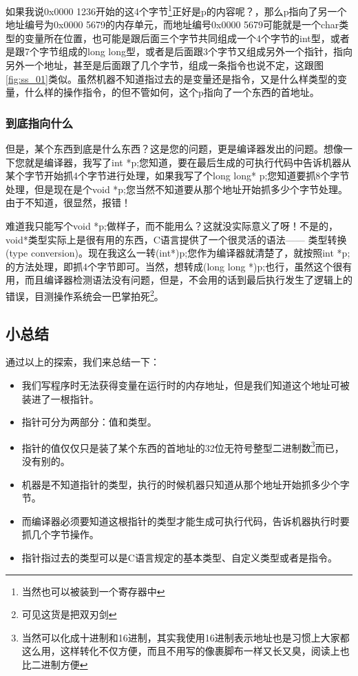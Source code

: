 \documentclass[11pt,twoside,a4paper,titlepage]{article}	%
\newcommand{\kw}[1]{\textcolor[rgb]{0.0,0.0,0.63}{ #1}}
\begin{document}
如果我说0x0000 1236开始的这4个字节\footnote{当然也可以被装到一个寄存器中}正好是p的内容呢？，那么p指向了另一个地址编号为0x0000 5679的内存单元，而地址编号0x0000 5679可能就是一个char类型的变量所在位置，也可能是跟后面三个字节共同组成一个4个字节的int型，或者是跟7个字节组成的long long型，或者是后面跟3个字节又组成另外一个指针，指向另外一个地址，甚至是后面跟了几个字节，组成一条指令也说不定，这跟图 \ref{fig:ss_01}类似。虽然机器不知道指过去的是变量还是指令，又是什么样类型的变量，什么样的操作指令，的但不管如何，这个p指向了一个东西的首地址。

\subsubsection{到底指向什么}
但是，某个东西到底是什么东西？这是您的问题，更是编译器发出的问题。想像一下您就是编译器，我写了int *p;您知道，要在最后生成的可执行代码中告诉机器从某个字节开始抓4个字节进行处理，如果我写了个long long* p;您知道要抓8个字节处理，但是现在是个void *p;您当然不知道要从那个地址开始抓多少个字节处理。由于不知道，很显然，报错！

难道我只能写个void *p;做样子，而不能用么？这就没实际意义了呀！不是的，void*类型实际上是很有用的东西，C语言提供了一个很灵活的语法——\kw{类型转换(type conversion)}。现在我这么一转(int*)p;您作为编译器就清楚了，就按照int *p;的方法处理，即抓4个字节即可。当然，想转成(long long *)p;也行，虽然这个很有用，而且编译器检测语法没有问题，但是，不会用的话到最后执行发生了逻辑上的错误，目测操作系统会一巴掌拍死\footnote{可见这货是把双刃剑}。

\subsection{小总结}
通过以上的探索，我们来总结一下：
\begin{itemize}
	\item 我们写程序时无法获得变量在运行时的内存地址，但是我们知道这个地址可被装进了一根指针。
	\item 指针可分为两部分：值和类型。
	\item 指针的值仅仅只是装了某个东西的首地址的32位无符号整型二进制数\footnote{当然可以化成十进制和16进制，其实我使用16进制表示地址也是习惯上大家都这么用，这样转化不仅方便，而且不用写的像裹脚布一样又长又臭，阅读上也比二进制方便}而已，没有别的。
	\item 机器是不知道指针的类型，执行的时候机器只知道从那个地址开始抓多少个字节。
	\item 而编译器必须要知道这根指针的类型才能生成可执行代码，告诉机器执行时要抓几个字节操作。
	\item 指针指过去的类型可以是C语言规定的基本类型、自定义类型或者是指令。
\end{itemize}
\end{document}
